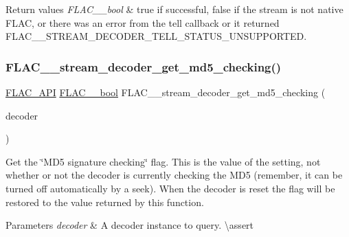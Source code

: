 \begin{DoxyRetVals}{Return values}
{\em F\+L\+A\+C\+\_\+\+\_\+bool} & {\ttfamily true} if successful, {\ttfamily false} if the stream is not native F\+L\+AC, or there was an error from the \textquotesingle{}tell\textquotesingle{} callback or it returned {\ttfamily F\+L\+A\+C\+\_\+\+\_\+\+S\+T\+R\+E\+A\+M\+\_\+\+D\+E\+C\+O\+D\+E\+R\+\_\+\+T\+E\+L\+L\+\_\+\+S\+T\+A\+T\+U\+S\+\_\+\+U\+N\+S\+U\+P\+P\+O\+R\+T\+ED}. \\
\hline
\end{DoxyRetVals}
\mbox{\label{group__flac__stream__decoder_ga3b19d2a761ea61cc57b12e31a5c1adf6}} 
\subsubsection{\texorpdfstring{FLAC\_\_stream\_decoder\_get\_md5\_checking()}{FLAC\_\_stream\_decoder\_get\_md5\_checking()}}
{\footnotesize\ttfamily \mbox{\hyperlink{group__flac__export_ga56ca07df8a23310707732b1c0007d6f5}{F\+L\+A\+C\+\_\+\+A\+PI}} \mbox{\hyperlink{ordinals_8h_a95103469f1cbd78b8cf250194985b34e}{F\+L\+A\+C\+\_\+\+\_\+bool}} F\+L\+A\+C\+\_\+\+\_\+stream\+\_\+decoder\+\_\+get\+\_\+md5\+\_\+checking (\begin{DoxyParamCaption}\item[{const \mbox{\hyperlink{struct_f_l_a_c_____stream_decoder}{F\+L\+A\+C\+\_\+\+\_\+\+Stream\+Decoder}} $\ast$}]{decoder }\end{DoxyParamCaption})}

Get the \char`\"{}\+M\+D5 signature checking\char`\"{} flag. This is the value of the setting, not whether or not the decoder is currently checking the M\+D5 (remember, it can be turned off automatically by a seek). When the decoder is reset the flag will be restored to the value returned by this function.


\begin{DoxyParams}{Parameters}
{\em decoder} & A decoder instance to query. \textbackslash{}assert 
\begin{DoxyCode}{1}
\end{DoxyCode}
 \\
\hline
\end{DoxyParams}

